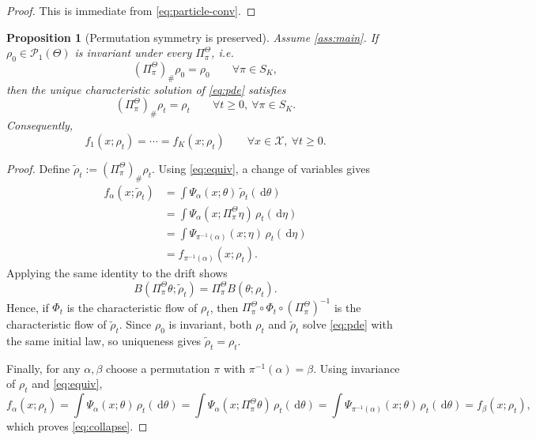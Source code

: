 \documentclass[11pt]{article}
\newtheorem{proposition}[theorem]{Proposition}
\theoremstyle{definition}
\newcommand{\PP}{\mathcal{P}}
\newcommand{\dd}{\,\mathrm{d}}
\begin{document}
\begin{proof}
This is immediate from \eqref{eq:particle-conv}.
\end{proof}

\begin{proposition}[Permutation symmetry is preserved]
\label{prop:symmetry}
Assume \cref{ass:main}. If $\rho_0\in\PP_1(\Theta)$ is invariant under every
$\Pi_\pi^\Theta$, i.e.
\[
  (\Pi_\pi^\Theta)_\#\rho_0=\rho_0
  \qquad
  \forall \pi\in S_K,
\]
then the unique characteristic solution of \cref{eq:pde} satisfies
\[
  (\Pi_\pi^\Theta)_\#\rho_t=\rho_t
  \qquad
  \forall t\ge 0,\ \forall \pi\in S_K.
\]
Consequently,
\begin{equation}
  f_1(x;\rho_t)=\cdots=f_K(x;\rho_t)
  \qquad
  \forall x\in\mathcal X,\ \forall t\ge 0.
  \label{eq:collapse}
\end{equation}
\end{proposition}

\begin{proof}
Define $\tilde\rho_t:=(\Pi_\pi^\Theta)_\#\rho_t$. Using \eqref{eq:equiv}, a
change of variables gives
\begin{align*}
  f_\alpha(x;\tilde\rho_t)
  &=
  \int \Psi_\alpha(x;\theta)\,\tilde\rho_t(\dd\theta) \\
  &=
  \int \Psi_\alpha(x;\Pi_\pi^\Theta\eta)\,\rho_t(\dd\eta) \\
  &=
  \int \Psi_{\pi^{-1}(\alpha)}(x;\eta)\,\rho_t(\dd\eta) \\
  &=
  f_{\pi^{-1}(\alpha)}(x;\rho_t).
\end{align*}
Applying the same identity to the drift shows
\[
  B(\Pi_\pi^\Theta\theta;\tilde\rho_t)
  =
  \Pi_\pi^\Theta B(\theta;\rho_t).
\]
Hence, if $\Phi_t$ is the characteristic flow of $\rho_t$, then
$\Pi_\pi^\Theta\circ\Phi_t\circ(\Pi_\pi^\Theta)^{-1}$ is the characteristic flow
of $\tilde\rho_t$. Since $\rho_0$ is invariant, both $\rho_t$ and $\tilde\rho_t$
solve \cref{eq:pde} with the same initial law, so uniqueness gives
$\tilde\rho_t=\rho_t$.

Finally, for any $\alpha,\beta$ choose a permutation $\pi$ with
$\pi^{-1}(\alpha)=\beta$. Using invariance of $\rho_t$ and \eqref{eq:equiv},
\[
  f_\alpha(x;\rho_t)
  =
  \int \Psi_\alpha(x;\theta)\,\rho_t(\dd\theta)
  =
  \int \Psi_\alpha(x;\Pi_\pi^\Theta\theta)\,\rho_t(\dd\theta)
  =
  \int \Psi_{\pi^{-1}(\alpha)}(x;\theta)\,\rho_t(\dd\theta)
  =
  f_\beta(x;\rho_t),
\]
which proves \eqref{eq:collapse}.
\end{proof}
\end{document}

